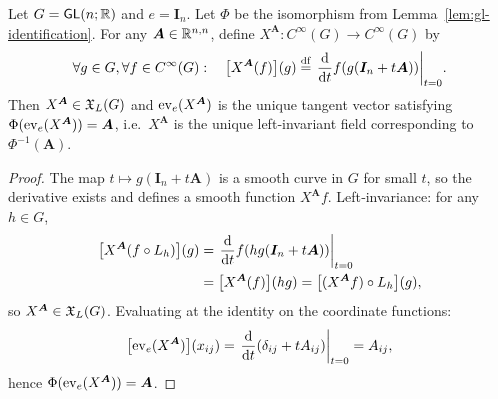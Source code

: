 \documentclass[11pt,reqno]{amsart}
\begin{document}
\begin{lemma}\label{lem:matrix-left-invariant}
  Let $G=\operatorname{\mathsf{GL}}(n;\mathbb{R})$ and $e=\bm I_n$.  Let $\Phi$ be the isomorphism from
  Lemma~\ref{lem:gl-identification}.  For any $\bm A\in\mathbb{R}^{n,n}$, define
  $X^{\bm A}:C^\infty(G)\to C^\infty(G)$ by
  \[
    \forall g\in G,\forall f\in C^\infty(G):\quad
    \FUNC{X^{\bm A}(f)}{g}\df
    \eval{\frac{\dd}{\dd t} f\Br{g\Br{\bm I_n + t\bm A}}}_{t=0}.
  \]
  Then $X^{\bm A}\in\mathfrak{X}_L(G)$ and $\mathrm{ev}_e(X^{\bm A})$ is the unique
  tangent vector satisfying $\Phi(\mathrm{ev}_e(X^{\bm A}))=\bm A$, i.e.\
  $X^{\bm A}$ is the unique left‑invariant field corresponding to
  $\Phi^{-1}(\bm A)$.
\end{lemma}
\begin{proof}
  The map $t\mapsto g(\bm I_n+t\bm A)$ is a smooth curve in $G$ for
  small $t$, so the derivative exists and defines a smooth function
  $X^{\bm A}f$.  Left‑invariance: for any $h\in G$,
  \[
    \begin{aligned}
    \FUNC{X^{\bm A}(f\circ L_h)}{g}
    &= \eval{\frac{\dd}{\dd t} f\Br{h g \Br{\bm I_n + t\bm A}}}_{t=0} \\
    &= \FUNC{X^{\bm A}(f)}{h g}
    = \FUNC{(X^{\bm A}f)\circ L_h}{g},
    \end{aligned}
  \]
  so $X^{\bm A}\in\mathfrak{X}_L(G)$.  Evaluating at the identity on the coordinate functions:
  \[
    \FUNC{\ev_e(X^{\bm A})}{x_{ij}}
    = \eval{\frac{\dd}{\dd t} (\delta_{ij} + t A_{ij})}_{t=0}
    = A_{ij},
  \]
  hence $\Phi(\mathrm{ev}_e(X^{\bm A})) = \bm A$.
\end{proof}
\end{document}
